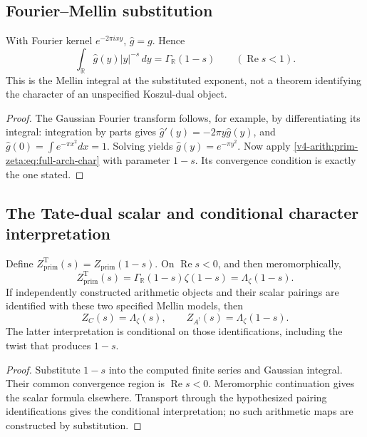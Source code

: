 \subsection{Fourier--Mellin substitution}
\label{v4-arith:prim-zeta:arch-fourier}
\begin{proposition}
\label{v4-arith:prim-zeta:prop:arch-cobar}
With Fourier kernel \(e^{-2\pi ixy}\), \(\widehat g=g\). Hence
\begin{equation}
\label{v4-arith:prim-zeta:eq:arch-cobar}
 \int_{\mathbb R}\widehat g(y)|y|^{-s}\,dy
 =\Gamma_{\mathbb R}(1-s)\qquad(\operatorname{Re}s<1).
\end{equation}
This is the Mellin integral at the substituted exponent, not a theorem
identifying the character of an unspecified Koszul-dual object.
\end{proposition}
\begin{proof}
The Gaussian Fourier transform follows, for example, by differentiating
its integral: integration by parts gives
\(\widehat g'(y)=-2\pi y\widehat g(y)\), and
\(\widehat g(0)=\int e^{-\pi x^2}dx=1\). Solving yields
\(\widehat g(y)=e^{-\pi y^2}\).
Now apply \eqref{v4-arith:prim-zeta:eq:full-arch-char} with parameter
\(1-s\). Its convergence condition is exactly the one stated.
\end{proof}

\subsection{The Tate-dual scalar and conditional character interpretation}
\label{v4-arith:prim-zeta:koszul-dual-adelic}
\begin{theorem}
\label{v4-arith:prim-zeta:thm:koszul-dual-adelic}
Define \(Z_{\mathrm{prim}}^{\mathrm T}(s)=Z_{\mathrm{prim}}(1-s)\).
On \(\operatorname{Re}s<0\), and then meromorphically,
\begin{equation}
\label{v4-arith:prim-zeta:eq:koszul-dual-adelic}
 Z_{\mathrm{prim}}^{\mathrm T}(s)
 =\Gamma_{\mathbb R}(1-s)\zeta(1-s)=\Lambda_\zeta(1-s).
\end{equation}
If independently constructed arithmetic objects and their scalar
pairings are identified with these two specified Mellin models, then
\begin{equation}
\label{v4-arith:prim-zeta:eq:koszul-dual}
 Z_C(s)=\Lambda_\zeta(s),\qquad Z_{A^!}(s)=\Lambda_\zeta(1-s).
\end{equation}
The latter interpretation is conditional on those identifications,
including the twist that produces \(1-s\).
\end{theorem}
\begin{proof}
Substitute \(1-s\) into the computed finite series and Gaussian integral.
Their common convergence region is \(\operatorname{Re}s<0\).
Meromorphic continuation gives the scalar formula elsewhere. Transport
through the hypothesized pairing identifications gives the conditional
interpretation; no such arithmetic maps are constructed by substitution.
\end{proof}

